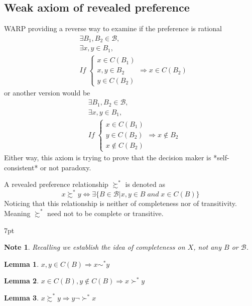 \documentclass{article}
\newenvironment{blueblock}{
\def\FrameCommand{
  \hspace{1pt}
    {\color{DarkBlue}
    \vrule width 2pt}
    {\color{blueshade}
    \vrule width 4pt}
  \colorbox{blueshade}
}
\MakeFramed{
  \advance
  \hsize-
  \width
  \FrameRestore}
\noindent\hspace{-4.55pt}%
\begin{adjustwidth}{}{7pt}
\vspace{2pt}\vspace{2pt}
}
{\vspace{2pt}\end{adjustwidth}\endMakeFramed}
\newtheorem{note}{Note}
\newtheorem{lemma}{Lemma}
\begin{document}
\subsection{Weak axiom of revealed preference}
WARP providing a reverse way to examine if the preference is rational
\begin{align}
&\exists B_{1},B_{2}\in \mathscr{B},
\\&\exists x,y \in B_{1},
\\&If\; \begin{cases}x\in C(B_{1}) \\
x,y \in B_{2}  \\
y\in C(B_{2})\end{cases}
\Rightarrow x\in C(B_{2})
\end{align}
or another version would be 
\begin{align}
&\exists B_{1},B_{2}\in \mathscr{B},
\\&\exists x,y\in B_{1}, 
\\&If\;\begin{cases}x\in C(B_{1})  \\
y\in C(B_{2})  \\
x\notin C(B_{2})
\end{cases} \Rightarrow x\notin B_{2}
\end{align}
Either way, this axiom is trying to prove that the decision maker is *self-consistent* or not paradoxy.

A revealed preference relationship $\succsim^{*}$ is denoted as
$$x\succsim^{*}y\iff\exists \{B\in \mathscr{B}|x,y\in B \;and \;x\in C(B)\}$$
Noticing that this relationship is neither of completeness nor of transitivity. Meaning $\succsim^{*}$ need not to be complete or transitive. 

\begin{blueblock}
\begin{note}
Recalling we establish the idea of completeness on $X$, not any $B$ or $\mathscr{B}$. 
\end{note}
\end{blueblock}

\begin{lemma}
$x,y\in C(B) \Rightarrow x\sim^{*} y$
\end{lemma}

\begin{lemma}
$x\in C(B),y\notin C(B) \Rightarrow x\succ^{*}y$
\end{lemma}

\begin{lemma}
$x \succsim^{*}y \Rightarrow y \neg \succ^{*}x$
\end{lemma}
\end{document}
